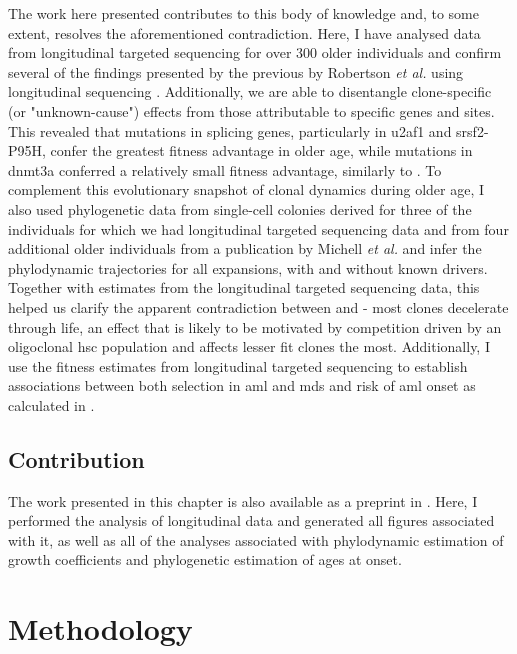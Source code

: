 The work here presented contributes to this body of knowledge and, to some extent, resolves the aforementioned contradiction. Here, I have analysed data from longitudinal targeted sequencing for over 300 older individuals and confirm several of the findings presented by the previous by Robertson \textit{et al.} using longitudinal sequencing \cite{Robertson2021-sw}. Additionally, we are able to disentangle clone-specific (or "unknown-cause") effects from those attributable to specific genes and sites. This revealed that mutations in splicing genes, particularly in \ac{u2af1} and \ac{srsf2}-P95H, confer the greatest fitness advantage in older age, while mutations in \ac{dnmt3a} conferred a relatively small fitness advantage, similarly to \cite{Robertson2021-sw}. To complement this evolutionary snapshot of clonal dynamics during older age, I also used phylogenetic data from single-cell colonies derived for three of the individuals for which we had longitudinal targeted sequencing data and from four additional older individuals from a publication by Michell \textit{et al.} \cite{Mitchell2021-zl} and infer the phylodynamic trajectories for all expansions, with and without known drivers. Together with estimates from the longitudinal targeted sequencing data, this helped us clarify the apparent contradiction between \cite{Robertson2021-sw} and \cite{Watson2020-pz} - most clones decelerate through life, an effect that is likely to be motivated by competition driven by an oligoclonal \ac{hsc} population and affects lesser fit clones the most. Additionally, I use the fitness estimates from longitudinal targeted sequencing to establish associations between both selection in \ac{aml} and \ac{mds} and risk of \ac{aml} onset as calculated in \cite{Abelson2018-wh}.

\subsection{Contribution}

The work presented in this chapter is also available as a preprint in \cite{Fabre2021-uw}. Here, I performed the analysis of longitudinal data and generated all figures associated with it, as well as all of the analyses associated with phylodynamic estimation of growth coefficients and phylogenetic estimation of ages at onset.

\section{Methodology}

